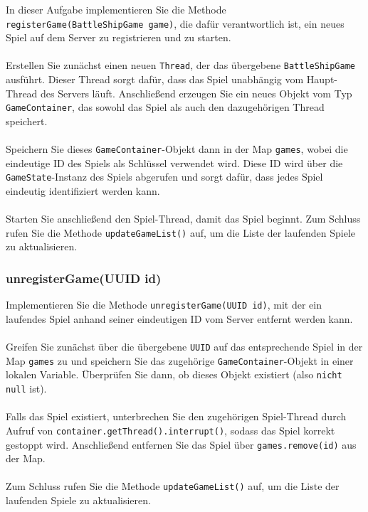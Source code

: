 \documentclass[12pt]{article}
\begin{document}
In dieser Aufgabe implementieren Sie die Methode \texttt{registerGame\hspace{0pt}(BattleShipGame game)}, 
die dafür verantwortlich ist, ein neues Spiel auf dem Server zu registrieren und zu starten.
\\ \\
Erstellen Sie zunächst einen neuen \texttt{Thread}, der das übergebene \texttt{BattleShipGame} ausführt. 
Dieser Thread sorgt dafür, dass das Spiel unabhängig vom Haupt-Thread des Servers läuft. 
Anschließend erzeugen Sie ein neues Objekt vom Typ \texttt{GameContainer}, 
das sowohl das Spiel als auch den dazugehörigen Thread speichert.
\\ \\
Speichern Sie dieses \texttt{GameContainer}-Objekt dann in der Map \texttt{games}, 
wobei die eindeutige ID des Spiels als Schlüssel verwendet wird. 
Diese ID wird über die \texttt{GameState}-Instanz des Spiels abgerufen 
und sorgt dafür, dass jedes Spiel eindeutig identifiziert werden kann.
\\ \\
Starten Sie anschließend den Spiel-Thread, damit das Spiel beginnt. 
Zum Schluss rufen Sie die Methode \texttt{updateGameList()} auf, 
um die Liste der laufenden Spiele zu aktualisieren.

\subsubsection*{unregisterGame(UUID id)}

Implementieren Sie die Methode \texttt{unregisterGame(UUID id)}, 
mit der ein laufendes Spiel anhand seiner eindeutigen ID vom Server entfernt werden kann.
\\ \\
Greifen Sie zunächst über die übergebene \texttt{UUID} auf das entsprechende Spiel in der Map \texttt{games} zu 
und speichern Sie das zugehörige \texttt{GameContainer}-Objekt in einer lokalen Variable. 
Überprüfen Sie dann, ob dieses Objekt existiert (also \texttt{nicht null} ist).
\\ \\
Falls das Spiel existiert, unterbrechen Sie den zugehörigen Spiel-Thread durch Aufruf von 
\texttt{container.getThread().interrupt()}, sodass das Spiel korrekt gestoppt wird. 
Anschließend entfernen Sie das Spiel über \texttt{games.remove(id)} aus der Map.
\\ \\
Zum Schluss rufen Sie die Methode \texttt{updateGameList()} auf, 
um die Liste der laufenden Spiele zu aktualisieren.
\end{document}
